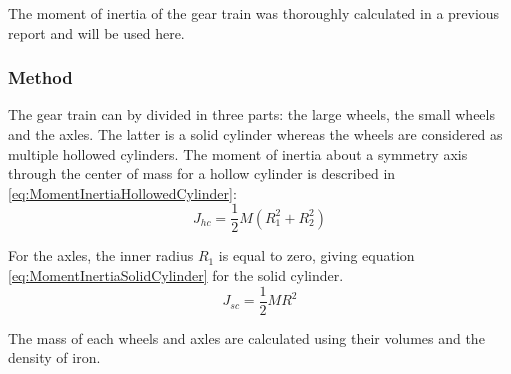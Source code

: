 
The moment of inertia of the gear train was thoroughly calculated in a previous report and will be used here.

\subsubsection*{Method}
The gear train can by divided in three parts: the large wheels, the small wheels and the axles. The latter is a solid cylinder whereas the wheels are considered as multiple hollowed cylinders. The moment of inertia about a symmetry axis through the center of mass for a hollow cylinder is described in \autoref{eq:MomentInertiaHollowedCylinder}: 
\begin{equation}
	J_{hc} = \frac{1}{2} M (R_1^2 + R_2^2)
	\label{eq:MomentInertiaHollowedCylinder}
\end{equation}
\startexplain
{}
\stopexplain

For the axles, the inner radius $R_1$ is equal to zero, giving equation \autoref{eq:MomentInertiaSolidCylinder} for the solid cylinder.
\begin{equation}
	J_{sc} = \frac{1}{2} M R^2
	\label{eq:MomentInertiaSolidCylinder}
\end{equation}
\startexplain
{}
\stopexplain

The mass of each wheels and axles are calculated using their volumes and the density of iron.

